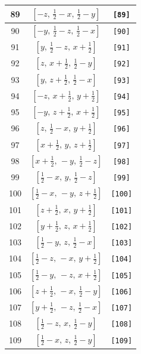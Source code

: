 \documentclass[fleqn,8pt]{jsarticle}
\begin{document}
\begin{longtable}{ccc}
89 & $\left[ - z,\, \frac{1}{2} - x,\, \frac{1}{2} - y \right]$ & {\tt [89]} \\ \hline
90 & $\left[ - y,\, \frac{1}{2} - z,\, \frac{1}{2} - x \right]$ & {\tt [90]} \\ \hline
91 & $\left[ y,\, \frac{1}{2} - z,\, x + \frac{1}{2} \right]$ & {\tt [91]} \\ \hline
92 & $\left[ z,\, x + \frac{1}{2},\, \frac{1}{2} - y \right]$ & {\tt [92]} \\ \hline
93 & $\left[ y,\, z + \frac{1}{2},\, \frac{1}{2} - x \right]$ & {\tt [93]} \\ \hline
94 & $\left[ - z,\, x + \frac{1}{2},\, y + \frac{1}{2} \right]$ & {\tt [94]} \\ \hline
95 & $\left[ - y,\, z + \frac{1}{2},\, x + \frac{1}{2} \right]$ & {\tt [95]} \\ \hline
96 & $\left[ z,\, \frac{1}{2} - x,\, y + \frac{1}{2} \right]$ & {\tt [96]} \\ \hline
97 & $\left[ x + \frac{1}{2},\, y,\, z + \frac{1}{2} \right]$ & {\tt [97]} \\ \hline
98 & $\left[ x + \frac{1}{2},\, - y,\, \frac{1}{2} - z \right]$ & {\tt [98]} \\ \hline
99 & $\left[ \frac{1}{2} - x,\, y,\, \frac{1}{2} - z \right]$ & {\tt [99]} \\ \hline
100 & $\left[ \frac{1}{2} - x,\, - y,\, z + \frac{1}{2} \right]$ & {\tt [100]} \\ \hline
101 & $\left[ z + \frac{1}{2},\, x,\, y + \frac{1}{2} \right]$ & {\tt [101]} \\ \hline
102 & $\left[ y + \frac{1}{2},\, z,\, x + \frac{1}{2} \right]$ & {\tt [102]} \\ \hline
103 & $\left[ \frac{1}{2} - y,\, z,\, \frac{1}{2} - x \right]$ & {\tt [103]} \\ \hline
104 & $\left[ \frac{1}{2} - z,\, - x,\, y + \frac{1}{2} \right]$ & {\tt [104]} \\ \hline
105 & $\left[ \frac{1}{2} - y,\, - z,\, x + \frac{1}{2} \right]$ & {\tt [105]} \\ \hline
106 & $\left[ z + \frac{1}{2},\, - x,\, \frac{1}{2} - y \right]$ & {\tt [106]} \\ \hline
107 & $\left[ y + \frac{1}{2},\, - z,\, \frac{1}{2} - x \right]$ & {\tt [107]} \\ \hline
108 & $\left[ \frac{1}{2} - z,\, x,\, \frac{1}{2} - y \right]$ & {\tt [108]} \\ \hline
109 & $\left[ \frac{1}{2} - x,\, z,\, \frac{1}{2} - y \right]$ & {\tt [109]} \\ \hline

\end{longtable}
\end{document}

